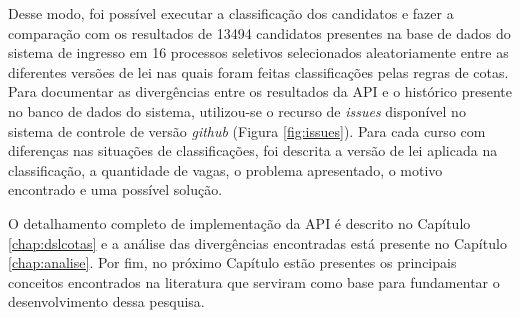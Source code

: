Desse modo, foi possível executar a classificação dos candidatos e fazer a comparação com os resultados de 13494 candidatos presentes na base de dados do sistema de ingresso em 16 processos seletivos selecionados aleatoriamente entre as diferentes versões de lei nas quais foram feitas classificações pelas regras de cotas. Para documentar as divergências entre os resultados da \gls{API} e o histórico presente no banco de dados do sistema, utilizou-se o recurso de \textit{issues} disponível no sistema de controle de versão \textit{github} (Figura \ref{fig:issues}). Para cada curso com diferenças nas situações de classificações, foi descrita a versão de lei aplicada na classificação, a quantidade de vagas, o problema apresentado, o motivo encontrado e uma possível solução.




O detalhamento completo de implementação da \gls{API} é descrito no Capítulo \ref{chap:dslcotas} e a análise das divergências encontradas está presente no Capítulo \ref{chap:analise}. Por fim, no próximo Capítulo estão presentes os principais conceitos encontrados na literatura que serviram como base para fundamentar o desenvolvimento dessa pesquisa.